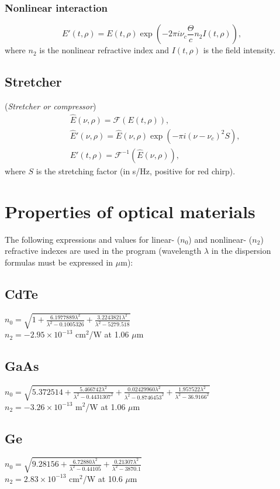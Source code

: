 \documentclass{report}
\begin{document}
\subsubsection*{Nonlinear interaction}
\begin{equation*}
E'(t,\rho) = E(t,\rho) \exp\left(-2\pi i \nu_c \frac{\Theta}{c} n_2 I(t,\rho)\right),
\end{equation*}
where $n_2$ is the nonlinear refractive index and $I(t,\rho)$ is the field intensity.

\subsection*{Stretcher}
(\textit{Stretcher or compressor})
\begin{align*}
&\widehat{E}(\nu,\rho) = \mathcal{F}(E(t,\rho)),\\
&\widehat{E}'(\nu,\rho) = \widehat{E}(\nu,\rho) \exp\left(- \pi i (\nu-\nu_c)^2  S\right),\\
&E'(t,\rho) = \mathcal{F}^{-1}(\widehat{E}(\nu,\rho)),
\end{align*}
where $S$ is the stretching factor (in s/Hz, positive for red chirp).

\section{Properties of optical materials}
The following expressions and values for linear- ($n_0$) and nonlinear- ($n_2$) refractive indexes are used in the program (wavelength $\lambda$ in the dispersion formulas must be expressed in $\mu$m):

\subsection*{CdTe}
$n_0=\sqrt{1+\frac{6.1977889\lambda^2}{\lambda^2-0.1005326}+\frac{3.2243821\lambda^2}{\lambda^2-5279.518}}$ \cite{DeBell-1979}\\
$n_2 = -2.95\times 10^{-13}$ cm$^2$/W at 1.06 $\mu$m \cite{Sheik-Bahae-1991}
\subsection*{GaAs}
$n_0=\sqrt{5.372514+\frac{5.466742\lambda^2}{\lambda^2-0.4431307^2}+\frac{0.02429960\lambda^2}{\lambda^2-0.8746453^2}+\frac{1.957522\lambda^2}{\lambda^2-36.9166^2}}$ \cite{Skauli-2003}\\
$n_2 = -3.26\times 10^{-13}$ m$^2$/W at 1.06 $\mu$m \cite{Sheik-Bahae-1991}
\subsection*{Ge}
$n_0=\sqrt{9.28156+\frac{6.72880\lambda^2}{\lambda^2-0.44105}+\frac{0.21307\lambda^2}{\lambda^2-3870.1}}$ \cite{Barnes-1979}\\
$n_2 = 2.83\times 10^{-13}$ cm$^2$/W at 10.6 $\mu$m \cite{Sheik-Bahae-1991}
\end{document}
